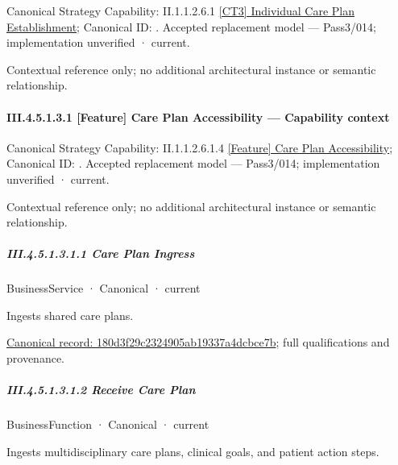 {\small Canonical Strategy Capability: II.1.1.2.6.1 \hyperref[element:03ea71cc13094c62ab6bbc6f51b1fffc]{[CT3] Individual Care Plan Establishment}; Canonical ID: \texttt{}. Accepted replacement model — Pass3/014; implementation unverified · current.}\par
Contextual reference only; no additional architectural instance or semantic relationship.\par
\paragraph*{III.4.5.1.3.1 [Feature] Care Plan Accessibility — Capability context}
\label{navigation:III.4.5.1.3.1}

{\small Canonical Strategy Capability: II.1.1.2.6.1.4 \hyperref[element:ca741f8bbfd246cc9a39ec117b24fa0c]{[Feature] Care Plan Accessibility}; Canonical ID: \texttt{}. Accepted replacement model — Pass3/014; implementation unverified · current.}\par
Contextual reference only; no additional architectural instance or semantic relationship.\par
\subparagraph*{III.4.5.1.3.1.1 Care Plan Ingress}
\label{navigation:III.4.5.1.3.1.1}

\label{element:180d3f29c2324905ab19337a4dcbce7b}
{\small BusinessService · Canonical · current}\par

Ingests shared care plans.


{\footnotesize \href{../../../../../../../../continuum/business/business-service/180d3f29c2324905ab19337a4dcbce7b.md}{Canonical record: 180d3f29c2324905ab19337a4dcbce7b}; full qualifications and provenance.}\par
\subparagraph*{III.4.5.1.3.1.2 Receive Care Plan}
\label{navigation:III.4.5.1.3.1.2}

\label{element:abb5a2ac72424923ae2da671b94b3b48}
{\small BusinessFunction · Canonical · current}\par

Ingests multidisciplinary care plans, clinical goals, and patient action steps.


